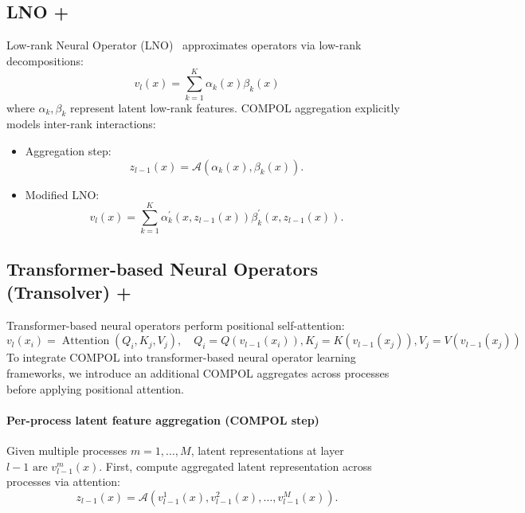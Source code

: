 \subsection{LNO + \ours}
Low-rank Neural Operator (LNO)~\citep{kovachki2023neural} approximates operators via low-rank decompositions:
\[
	v_l(x)=\sum_{k=1}^K \alpha_k(x) \beta_k(x)
\]
where $\alpha_k, \beta_k$ represent latent low-rank features. COMPOL aggregation explicitly models inter-rank interactions:
\begin{itemize}
	\item Aggregation step:
	\[
		z_{l-1}(x)=\mathcal{A}\left(\alpha_k(x), \beta_k(x)\right).
	\]
	\item Modified LNO:
	\[
		v_l(x)=\sum_{k=1}^K \alpha_k^{\prime}\left(x, z_{l-1}(x)\right) \beta_k^{\prime}\left(x, z_{l-1}(x)\right).
	\]
\end{itemize}

\subsection{Transformer-based Neural Operators (\eg Transolver) + \ours}
Transformer-based neural operators perform positional self-attention:
\[
	v_l\left(x_i\right)=\operatorname{Attention}\left(Q_i, K_j, V_j\right), \quad Q_i=Q\left(v_{l-1}\left(x_i\right)\right), K_j=K\left(v_{l-1}\left(x_j\right)\right), V_j=V\left(v_{l-1}\left(x_j\right)\right)
\]
To integrate COMPOL into transformer-based neural operator learning frameworks, we introduce an additional COMPOL aggregates across processes before applying positional attention.

\paragraph{Per-process latent feature aggregation (COMPOL step)} Given multiple processes $m=1, \ldots, M$, latent representations at layer $l-1 \text { are } v_{l-1}^m(x)$. First, compute aggregated latent representation across processes via attention:
\[
	z_{l-1}(x)=\mathcal{A}\left(v_{l-1}^1(x), v_{l-1}^2(x), \ldots, v_{l-1}^M(x)\right) .
\]

